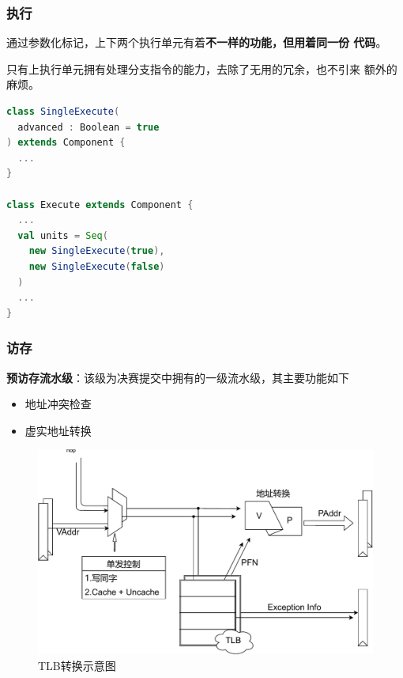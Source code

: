 \documentclass{beamer}
\begin{document}
\begin{frame}[fragile]
    \frametitle{执行}
    \begin{minipage}[c]{0.23\linewidth}
        通过参数化标记，上下两个执行单元有着\textbf{不一样的功能，但用着同一份
        代码}。

        只有上执行单元拥有处理分支指令的能力，去除了无用的冗余，也不引来
        额外的麻烦。
    \end{minipage}
    \hfill\begin{minipage}{0.70\linewidth}
\begin{lstlisting}[language=scala]
class SingleExecute(
  advanced : Boolean = true
) extends Component {
  ...
}

class Execute extends Component {
  ...
  val units = Seq(
    new SingleExecute(true),
    new SingleExecute(false)
  )
  ...
}
\end{lstlisting}
    \end{minipage}
\end{frame}

\begin{frame}
    \frametitle{访存}
    \textbf{预访存流水级}：该级为决赛提交中拥有的一级流水级，其主要功能如下
    \begin{itemize}
        \item 地址冲突检查
        \item 虚实地址转换
    \end{itemize}
    \begin{figure}
        \centering
        \includegraphics[width=.7\linewidth]{pic/tlb.pdf}
        \caption{TLB转换示意图}
    \end{figure}
\end{frame}
\end{document}
